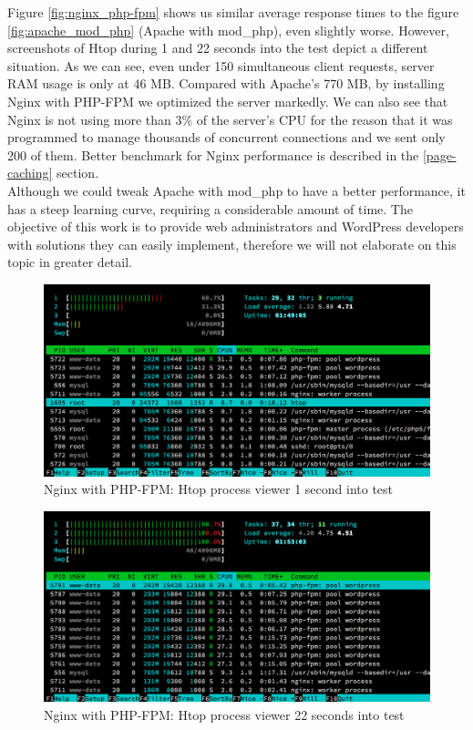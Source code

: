 Figure \ref{fig:nginx_php-fpm} shows us similar average response times to the figure \ref{fig:apache_mod_php} (Apache with mod\_php), even slightly worse. However, screenshots of Htop during 1 and 22 seconds into the test depict a different situation. As we can see, even under 150 simultaneous client requests, server RAM usage is only at 46 MB. Compared with Apache's 770 MB, by installing Nginx with PHP-FPM we optimized the server markedly. We can also see that Nginx is not using more than 3\% of the server's CPU for the reason that it was programmed to manage thousands of concurrent connections and we sent only 200 of them. Better benchmark for Nginx performance is described in the \ref{page-caching} section. \\

Although we could tweak Apache with mod\_php to have a better performance, it has a steep learning curve, requiring a considerable amount of time. The objective of this work is to provide web administrators and WordPress developers with solutions they can easily implement, therefore we will not elaborate on this topic in greater detail. 

\begin{figure}[H]
\begin{center}
\includegraphics[scale=0.5]{figures/Nginx_PHP-FPM_1s.png}
\caption{Nginx with PHP-FPM: Htop process viewer 1 second into test}
\label{fig:nginx_php-fpm_1s}
\end{center}
\end{figure}

\begin{figure}[H]
\begin{center}
\includegraphics[scale=0.5]{figures/Nginx_PHP-FPM_22s.png}
\caption{Nginx with PHP-FPM: Htop process viewer 22 seconds into test}
\label{fig:nginx_php-fpm_22s}
\end{center}
\end{figure}

